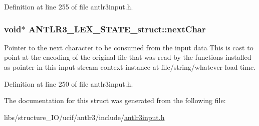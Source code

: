 Definition at line 255 of file antlr3input.\-h.

\hypertarget{struct_a_n_t_l_r3___l_e_x___s_t_a_t_e__struct_ac1a199a9d03827b5a0f4903c471a8823}{
\subsubsection[{next\-Char}]{\setlength{\rightskip}{0pt plus 5cm}void$\ast$ A\-N\-T\-L\-R3\-\_\-\-L\-E\-X\-\_\-\-S\-T\-A\-T\-E\-\_\-struct\-::next\-Char}}\label{struct_a_n_t_l_r3___l_e_x___s_t_a_t_e__struct_ac1a199a9d03827b5a0f4903c471a8823}
Pointer to the next character to be consumed from the input data This is cast to point at the encoding of the original file that was read by the functions installed as pointer in this input stream context instance at file/string/whatever load time. 

Definition at line 250 of file antlr3input.\-h.



The documentation for this struct was generated from the following file\-:\begin{DoxyCompactItemize}
\item 
libs/structure\-\_\-\-I\-O/ucif/antlr3/include/\hyperlink{antlr3input_8h}{antlr3input.\-h}\end{DoxyCompactItemize}
